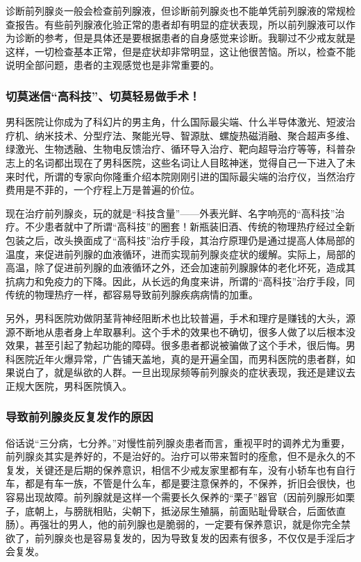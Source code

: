 诊断前列腺炎一般会检查前列腺液，但诊断前列腺炎也不能单凭前列腺液的常规检查报告。有些前列腺液化验正常的患者却有明显的症状表现，所以前列腺液可以作为诊断的参考，但是具体还是要根据患者的自身感觉来诊断。我聊过不少戒友就是这样，一切检查基本正常，但是症状却非常明显，这让他很苦恼。所以，检查不能说明全部问题，患者的主观感觉也是非常重要的。

\subsubsection{切莫迷信“高科技”、切莫轻易做手术！}

男科医院让你成为了科幻片的男主角，什么国际最尖端、什么半导体激光、短波治疗机、纳米技术、分型疗法、聚能光导、智源肽、螺旋热磁消融、聚合超声多维、绿激光、生物透融、生物电反馈治疗、循环导入治疗、靶向超导治疗等等，科普杂志上的名词都出现在了男科医院，这些名词让人目眩神迷，觉得自己一下进入了未来时代，所谓的专家向你隆重介绍本院刚刚引进的国际最尖端的治疗仪，当然治疗费用是不菲的，一个疗程上万是普遍的价位。

现在治疗前列腺炎，玩的就是“科技含量”——外表光鲜、名字响亮的“高科技”治疗。不少患者就中了所谓“高科技”的圈套！新瓶装旧酒、传统的物理热疗经过全新包装之后，改头换面成了“高科技”治疗手段，其治疗原理仍是通过提高人体局部的温度，来促进前列腺的血液循环，进而实现前列腺炎症状的缓解。实际上，局部的高温，除了促进前列腺的血液循环之外，还会加速前列腺腺体的老化坏死，造成其抗病力和免疫力的下降。因此，从长远的角度来讲，所谓的“高科技”治疗手段，同传统的物理热疗一样，都容易导致前列腺疾病病情的加重。

另外，男科医院劝做阴茎背神经阻断术也比较普遍，手术和理疗是赚钱的大头，源源不断地从患者身上牟取暴利。这个手术的效果也不确切，很多人做了以后根本没效果，甚至引起了勃起功能的障碍。很多患者都说被骗做了这个手术，很后悔。男科医院近年火爆异常，广告铺天盖地，真的是开遍全国，而男科医院的患者群，如果说白了，就是纵欲的人群。一旦出现尿频等前列腺炎的症状表现，我还是建议去正规大医院，男科医院慎入。

\subsubsection{导致前列腺炎反复发作的原因}

俗话说“三分病，七分养。”对慢性前列腺炎患者而言，重视平时的调养尤为重要，前列腺炎其实是养好的，不是治好的。治疗可以带来暂时的痊愈，但不是永久的不复发，关键还是后期的保养意识，相信不少戒友家里都有车，没有小轿车也有自行车，都是有车一族，不管是什么车，都是要注意保养的，不保养，折旧会很快，也容易出现故障。前列腺就是这样一个需要长久保养的“栗子”器官（因前列腺形如栗子，底朝上，与膀胱相贴，尖朝下，抵泌尿生殖膈，前面贴耻骨联合，后面依直肠）。再强壮的男人，他的前列腺也是脆弱的，一定要有保养意识，就是你完全禁欲了，前列腺炎也是容易复发的，因为导致复发的因素有很多，不仅仅是手淫后才会复发。

